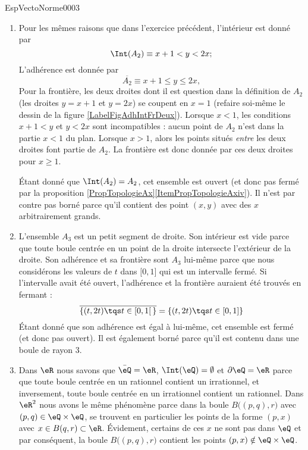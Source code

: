 \begin{corrige}{EspVectoNorme0003}
\begin{enumerate}
		\item
			Pour les mêmes raisons que dans l'exercice précédent, l'intérieur est donné par
			\begin{equation}
				\Int(A_2)\equiv x+1<y<2x;
			\end{equation}
			L'adhérence est donnée par
			\begin{equation}
				\overline{ A_2 }\equiv x+1\leq y\leq 2x,
			\end{equation}
			Pour la frontière, les deux droites dont il est question dans la définition de $A_2$ (les droites $y=x+1$ et $y=2x$) se coupent en $x=1$ (refaire soi-même le dessin de la figure \ref{LabelFigAdhIntFrDeux}). Lorsque $x<1$, les conditions $x+1<y$ et $y<2x$ sont incompatibles : aucun point de $A_2$ n'est dans la partie $x<1$ du plan. Lorsque $x>1$, alors les points situés \emph{entre} les deux droites font partie de $A_2$. La frontière est donc donnée par ces deux droites pour $x\geq 1$. 

			Étant donné que $\Int(A_2)=A_2$, cet ensemble est ouvert (et donc pas fermé par la proposition \ref{PropTopologieAx}\ref{ItemPropTopologieAxiv}). Il n'est par contre pas borné parce qu'il contient des point $(x,y)$ avec des $x$ arbitrairement grands.

		\item
			L'ensemble $A_3$ est un petit segment de droite. Son intérieur est vide parce que toute boule centrée en un point de la droite intersecte l'extérieur de la droite. Son adhérence et sa frontière sont $A_3$ lui-même parce que nous considérons les valeurs de $t$ dans $\mathopen[ 0 , 1 \mathclose]$ qui est un intervalle fermé. Si l'intervalle avait été ouvert, l'adhérence et la frontière auraient été trouvés en fermant :
			\begin{equation}
                \overline{ \{ (t,2t)\tqs t\in\mathopen[ 0 , 1 [\, \}}=\{ (t,2t)\tqs t\in\mathopen[ 0 , 1 ] \}
			\end{equation}
			Étant donné que son adhérence est égal à lui-même, cet ensemble est fermé (et donc pas ouvert). Il est également borné parce qu'il est contenu dans une boule de rayon $3$.
		\item
			Dans $\eR$ nous savons que $\bar\eQ=\eR$, $\Int(\eQ)=\emptyset$ et $\partial\eQ=\eR$ parce que toute boule centrée en un rationnel contient un irrationnel, et inversement, toute boule centrée en un irrationnel contient un rationnel. Dans $\eR^2$ nous avons le même phénomène parce dans la boule $B\big( (p,q),r \big)$ avec $(p,q)\in\eQ\times\eQ$, se trouvent en particulier les points de la forme $(p,x)$ avec $x\in B(q,r)\subset\eR$. Évidement, certains de ces $x$ ne sont pas dans $\eQ$ et par conséquent, la boule $B\big( (p,q),r \big)$ contient les points $(p,x)\notin\eQ\times\eQ$.


\end{enumerate}
\end{corrige}
